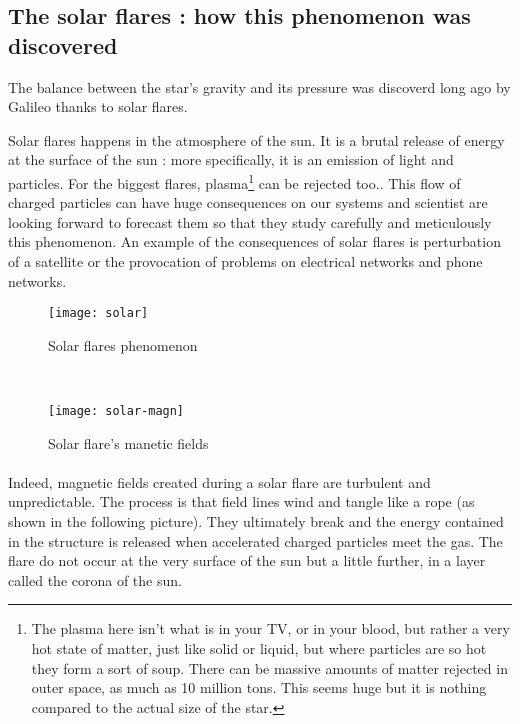 \documentclass[a4paper, 11pt]{article} %
\begin{document}
\subsection{The solar flares : how this phenomenon was discovered}

The balance between the star's gravity and its pressure was discoverd long ago by Galileo thanks to solar flares.

Solar flares happens in the atmosphere of the sun. It is a brutal release of energy at the surface of the sun : more specifically, it is an emission of light and particles. For the biggest flares, plasma\footnote{The plasma here isn't what is in your TV, or in your blood, but rather a very hot state of matter, just like solid or liquid, but where particles are so hot they form a sort of soup. There can be massive amounts of matter rejected in outer space, as much as 10 million tons. This seems huge but it is nothing compared to the actual size of the star.} can be rejected too.. This flow of charged particles can have huge consequences on our systems and scientist are looking forward to forecast them so that they study carefully and meticulously this phenomenon. An example of the consequences of solar flares is perturbation of a satellite or the provocation of problems on electrical networks and phone networks.

\begin{figure*}[h!]
    \centering
  \begin{subfigure}[b]{0.45\textwidth}
      \texttt{[image: solar]}
      \caption{Solar flares phenomenon}
  \end{subfigure}%
  ~ 
  \begin{subfigure}[b]{0.45\textwidth}
      \centering
      \texttt{[image: solar-magn]}
      \caption{Solar flare's manetic fields}
  \end{subfigure}
\end{figure*}



\paragraph*{}
Indeed, magnetic fields created during a solar flare are turbulent and unpredictable. The process is that field lines wind and tangle like a rope (as shown in the following picture). They ultimately break and the energy contained in the structure is released when accelerated charged particles meet the gas. The flare do not occur at the very surface of the sun but a little further, in a layer called the corona of the sun. 
\end{document}
